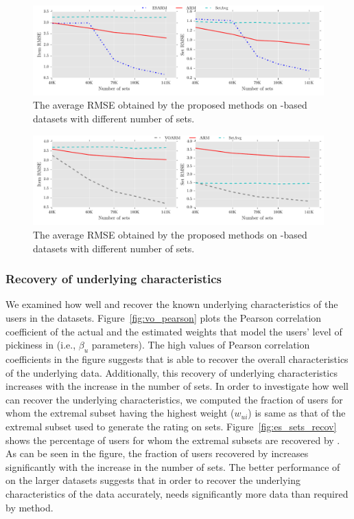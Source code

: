 \begin{figure}[t]
  \centerline{\includegraphics[scale=0.57]{figures/es_sets_sz.pdf}}
  \caption{The average RMSE obtained by the proposed methods on \ES-based datasets with different number of sets.}
  \label{fig:es_sets_sz}
\end{figure}

\begin{figure}[t]
  \centerline{\includegraphics[scale=0.57]{figures/vo_sets_sz.pdf}}
  \caption{The average RMSE obtained by the proposed methods on \VO-based datasets with different number of sets.}
  \label{fig:vo_sets_sz}
\end{figure}




\subsubsection{Recovery of underlying characteristics}\label{ch:lfs:syn_recov}
We examined how well \ES and \VO recover the known underlying characteristics
of the users in the datasets. Figure~\ref{fig:vo_pearson} plots the Pearson correlation coefficient of
the actual and the estimated weights that model the users' level of pickiness in
\VO (i.e., $\beta_u$ parameters). The high values of Pearson correlation
coefficients in the figure
suggests that \VO is able to recover the overall characteristics of the
underlying data. Additionally, this recovery of underlying characteristics
increases with the increase in the number of sets. In order to investigate how well \ES can recover the underlying characteristics,
we computed the fraction of users for whom the extremal subset having the
highest weight ($w_{ui}$) is same as that of the extremal subset used to generate
the rating on sets.   
Figure~\ref{fig:es_sets_recov} shows the percentage of users for whom the extremal subsets are
recovered by \ES. 
As can be seen in the figure, the fraction of users recovered
by \ES increases significantly with the increase in the number of
sets.
The better performance of \ES on the larger
datasets suggests that in order to recover the underlying characteristics of the
data accurately, \ES needs significantly more data than required by
\VO method.

